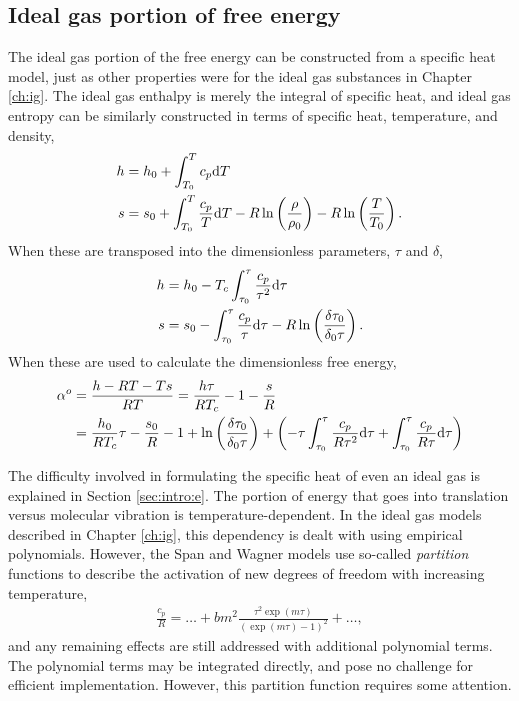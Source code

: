 \subsection{Ideal gas portion of free energy}
The ideal gas portion of the free energy can be constructed from a specific heat model, just as other properties were for the ideal gas substances in Chapter \ref{ch:ig}.  The ideal gas enthalpy is merely the integral of specific heat, and ideal gas entropy can be similarly constructed in terms of specific heat, temperature, and density,
\begin{subequations}
\begin{align}
h &= h_0 + \int_{T_0}^T c_p \mathrm{d} T\\
s &= s_0 + \int_{T_0}^T \frac{c_p}{T} \mathrm{d} T - R \ln\left(\frac{\rho}{\rho_0}\right) - R\ln\left(\frac{T}{T_0}\right).
\end{align}
\end{subequations}
When these are transposed into the dimensionless parameters, $\tau$ and $\delta$,
\begin{align*}
h &= h_0 - T_c \int_{\tau_0}^\tau \frac{c_p}{\tau^2} \mathrm{d} \tau\\
s &= s_0 - \int_{\tau_0}^\tau \frac{c_p}{\tau} \mathrm{d} \tau - R \ln\left(\frac{\delta \tau_0}{\delta_0 \tau}\right).
\end{align*}
When these are used to calculate the dimensionless free energy,
\begin{align}
\alpha^o &= \frac{h - RT - Ts}{RT} = \frac{h \tau}{R T_c} - 1 - \frac{s}{R}\nonumber\\
 &= \frac{h_0}{RT_c} \tau - \frac{s_0}{R} - 1 + \ln\left(\frac{\delta \tau_0}{\delta_0 \tau}\right) + \left(-\tau\int_{\tau_0}^\tau \frac{c_p}{R \tau^2} \mathrm{d} \tau + \int_{\tau_0}^\tau \frac{c_p}{R \tau} \mathrm{d} \tau \right)\label{eqn:mp1:aodef}
\end{align}

The difficulty involved in formulating the specific heat of even an ideal gas is explained in Section \ref{sec:intro:e}.  The portion of energy that goes into translation versus molecular vibration is temperature-dependent.  In the ideal gas models described in Chapter \ref{ch:ig}, this dependency is dealt with using empirical polynomials.  However, the Span and Wagner models use so-called \emph{partition} functions to describe the activation of new degrees of freedom with increasing temperature,
\begin{align}
\frac{c_p}{R} = \ldots + b m^2 \frac{\tau^2 \exp(m\tau)}{\left(\exp(m\tau) - 1\right)^2} + \ldots\nonumber,
\end{align}
and any remaining effects are still addressed with additional polynomial terms.  The polynomial terms may be integrated directly, and pose no challenge for efficient implementation.  However, this partition function requires some attention.


